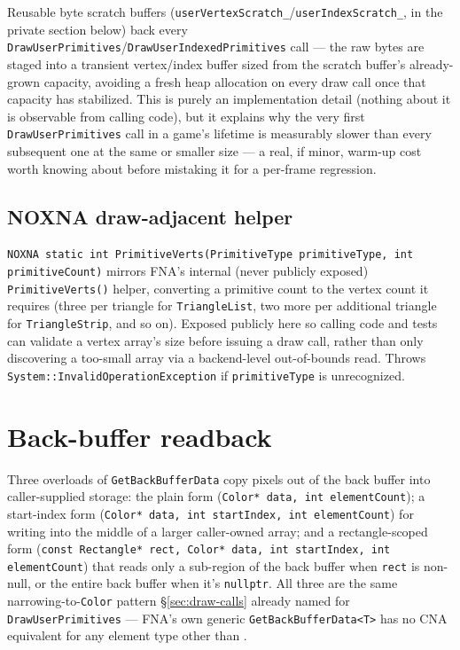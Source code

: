 \begin{sourcenote}
Reusable byte scratch buffers (\texttt{userVertexScratch\_}/\texttt{userIndexScratch\_}, in the
private section below) back every \texttt{DrawUserPrimitives}/\texttt{DrawUserIndexedPrimitives}
call --- the raw bytes are staged into a transient vertex/index buffer sized from the scratch
buffer's already-grown capacity, avoiding a fresh heap allocation on every draw call once that
capacity has stabilized. This is purely an implementation detail (nothing about it is
observable from calling code), but it explains why the very first \texttt{DrawUserPrimitives}
call in a game's lifetime is measurably slower than every subsequent one at the same or smaller
size --- a real, if minor, warm-up cost worth knowing about before mistaking it for a
per-frame regression.
\end{sourcenote}

\subsection{NOXNA draw-adjacent helper}

\texttt{NOXNA static int PrimitiveVerts(PrimitiveType primitiveType, int primitiveCount)}
mirrors FNA's internal (never publicly exposed) \texttt{PrimitiveVerts()} helper, converting a
primitive count to the vertex count it requires (three per triangle for
\texttt{TriangleList}, two more per additional triangle for \texttt{TriangleStrip}, and so on).
Exposed publicly here so calling code and tests can validate a vertex array's size before
issuing a draw call, rather than only discovering a too-small array via a backend-level
out-of-bounds read. Throws \texttt{System::InvalidOperationException} if \texttt{primitiveType}
is unrecognized.

\section{Back-buffer readback}
\label{sec:backbuffer-readback}

Three overloads of \texttt{GetBackBufferData} copy pixels out of the back buffer into
caller-supplied  storage: the plain form
(\texttt{Color* data, int elementCount}); a start-index form
(\texttt{Color* data, int startIndex, int elementCount}) for writing into the middle of a
larger caller-owned array; and a rectangle-scoped form
(\texttt{const Rectangle* rect, Color* data, int startIndex, int elementCount}) that reads only
a sub-region of the back buffer when \texttt{rect} is non-null, or the entire back buffer when
it's \texttt{nullptr}. All three are the same narrowing-to-\texttt{Color} pattern
\S\ref{sec:draw-calls} already named for \texttt{DrawUserPrimitives} --- FNA's own generic
\texttt{GetBackBufferData<T>} has no CNA equivalent for any element type other than
.

